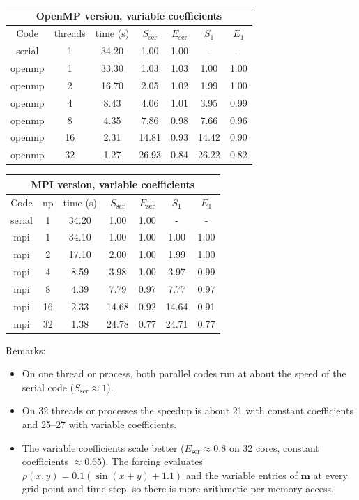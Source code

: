 \documentclass[11pt]{article}
\begin{document}
\begin{table}[H]\footnotesize
\begin{center}
\begin{tabular}{|c|c|c|c|c|c|c|} \hline
\multicolumn{7}{|c|}{OpenMP version, variable coefficients} \\ \hline
Code & threads & time (s) & $S_{\text{ser}}$ & $E_{\text{ser}}$ & $S_1$ & $E_1$ \\ \hline
serial & 1 & 34.20 & 1.00 & 1.00 & - & - \\
openmp & 1 & 33.30 & 1.03 & 1.03 & 1.00 & 1.00 \\
openmp & 2 & 16.70 & 2.05 & 1.02 & 1.99 & 1.00 \\
openmp & 4 & 8.43 & 4.06 & 1.01 & 3.95 & 0.99 \\
openmp & 8 & 4.35 & 7.86 & 0.98 & 7.66 & 0.96 \\
openmp & 16 & 2.31 & 14.81 & 0.93 & 14.42 & 0.90 \\
openmp & 32 & 1.27 & 26.93 & 0.84 & 26.22 & 0.82 \\
\hline
\end{tabular}
\end{center}
\end{table}
\begin{table}[H]\footnotesize
\begin{center}
\begin{tabular}{|c|c|c|c|c|c|c|} \hline
\multicolumn{7}{|c|}{MPI version, variable coefficients} \\ \hline
Code & np & time (s) & $S_{\text{ser}}$ & $E_{\text{ser}}$ & $S_1$ & $E_1$ \\ \hline
serial & 1 & 34.20 & 1.00 & 1.00 & - & - \\
mpi & 1 & 34.10 & 1.00 & 1.00 & 1.00 & 1.00 \\
mpi & 2 & 17.10 & 2.00 & 1.00 & 1.99 & 1.00 \\
mpi & 4 & 8.59 & 3.98 & 1.00 & 3.97 & 0.99 \\
mpi & 8 & 4.39 & 7.79 & 0.97 & 7.77 & 0.97 \\
mpi & 16 & 2.33 & 14.68 & 0.92 & 14.64 & 0.91 \\
mpi & 32 & 1.38 & 24.78 & 0.77 & 24.71 & 0.77 \\
\hline
\end{tabular}
\end{center}
\end{table}
Remarks:
\begin{itemize}
\item On one thread or process, both parallel codes run at about the speed of the serial code ($S_{\text{ser}}\approx 1$).
\item On 32 threads or processes the speedup is about 21 with constant coefficients and 25--27 with variable coefficients.
\item The variable coefficients scale better ($E_{\text{ser}}\approx 0.8$ on 32 cores, constant coefficients $\approx 0.65$). The forcing evaluates $\rho(x,y)=0.1(\sin(x+y)+1.1)$ and the variable entries of $\bm{m}$ at every grid point and time step, so there is more arithmetic per memory access.
\end{itemize}
\end{document}
